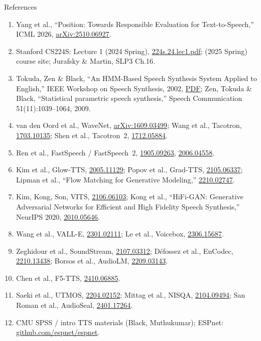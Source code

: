 \begin{frame}{References}
  \scriptsize
  \begin{enumerate}
    \item Yang et al., ``Position: Towards Responsible Evaluation for Text-to-Speech,'' ICML 2026, \href{https://arxiv.org/abs/2510.06927}{arXiv:2510.06927}.
    \item Stanford CS224S: Lecture 1 (2024 Spring), \href{https://web.stanford.edu/class/cs224s/semesters/2024-spring/lecture-slides/224s.24.lec1.pdf}{224s.24.lec1.pdf}; (2025 Spring) course site; Jurafsky \& Martin, SLP3 Ch.16.
    \item Tokuda, Zen \& Black, ``An HMM-Based Speech Synthesis System Applied to English,'' IEEE Workshop on Speech Synthesis, 2002, \href{https://www.cs.cmu.edu/~awb/papers/IEEE2002/hmmenglish.pdf}{PDF}; Zen, Tokuda \& Black, ``Statistical parametric speech synthesis,'' Speech Communication 51(11):1039--1064, 2009.
    \item van den Oord et al., WaveNet, \href{https://arxiv.org/abs/1609.03499}{arXiv:1609.03499}; Wang et al., Tacotron, \href{https://arxiv.org/abs/1703.10135}{1703.10135}; Shen et al., Tacotron~2, \href{https://arxiv.org/abs/1712.05884}{1712.05884}.
    \item Ren et al., FastSpeech / FastSpeech~2, \href{https://arxiv.org/abs/1905.09263}{1905.09263}, \href{https://arxiv.org/abs/2006.04558}{2006.04558}.
    \item Kim et al., Glow-TTS, \href{https://arxiv.org/abs/2005.11129}{2005.11129}; Popov et al., Grad-TTS, \href{https://arxiv.org/abs/2105.06337}{2105.06337}; Lipman et al., ``Flow Matching for Generative Modeling,'' \href{https://arxiv.org/abs/2210.02747}{2210.02747}.
    \item Kim, Kong, Son, VITS, \href{https://arxiv.org/abs/2106.06103}{2106.06103}; Kong et al., ``HiFi-GAN: Generative Adversarial Networks for Efficient and High Fidelity Speech Synthesis,'' NeurIPS 2020, \href{https://arxiv.org/abs/2010.05646}{2010.05646}.
    \item Wang et al., VALL-E, \href{https://arxiv.org/abs/2301.02111}{2301.02111}; Le et al., Voicebox, \href{https://arxiv.org/abs/2306.15687}{2306.15687}.
    \item Zeghidour et al., SoundStream, \href{https://arxiv.org/abs/2107.03312}{2107.03312}; D\'efossez et al., EnCodec, \href{https://arxiv.org/abs/2210.13438}{2210.13438}; Borsos et al., AudioLM, \href{https://arxiv.org/abs/2209.03143}{2209.03143}.
    \item Chen et al., F5-TTS, \href{https://arxiv.org/abs/2410.06885}{2410.06885}.
    \item Saeki et al., UTMOS, \href{https://arxiv.org/abs/2204.02152}{2204.02152}; Mittag et al., NISQA, \href{https://arxiv.org/abs/2104.09494}{2104.09494}; San Roman et al., AudioSeal, \href{https://arxiv.org/abs/2401.17264}{2401.17264}.
    \item CMU SPSS / intro TTS materials (Black, Muthukumar); ESPnet: \href{https://github.com/espnet/espnet}{github.com/espnet/espnet}.
  \end{enumerate}
\end{frame}
